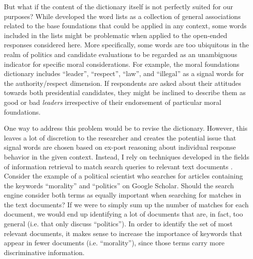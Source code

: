\documentclass[12pt]{article}
\begin{document}
But what if the content of the dictionary itself is not perfectly suited for our purposes? While \citet{graham2009liberals} developed the word lists as a collection of general associations related to the base foundations that could be applied in any context, some words included in the lists might be problematic when applied to the open-ended responses considered here. More specifically, some words are too ubiquitous in the realm of politics and candidate evaluations to be regarded as an unambiguous indicator for specific moral considerations. For example, the moral foundations dictionary includes ``leader'', ``respect'', ``law'', and ``illegal'' as a signal words for the authority/respect dimension. If respondents are asked about their attitudes towards both presidential candidates, they might be inclined to describe them as good or bad \textit{leaders} irrespective of their endorsement of particular moral foundations.

One way to address this problem would be to revise the dictionary. However, this leaves a lot of discretion to the researcher and creates the potential issue that signal words are chosen based on ex-post reasoning about individual response behavior in the given context. Instead, I rely on techniques developed in the fields of information retrieval to match search queries to relevant text documents \citep[see][for an introduction]{manning2008introduction}. Consider the example of a political scientist who searches for articles containing the keywords ``morality'' and ``politics'' on Google Scholar. Should the search engine consider both terms as equally important when searching for matches in the text documents? If we were to simply sum up the number of matches for each document, we would end up identifying a lot of documents that are, in fact, too general (i.e. that only discuss ``politics''). In order to identify the set of most relevant documents, it makes sense to increase the importance of keywords that appear in fewer documents (i.e. ``morality''), since those terms carry more discriminative information.
\end{document}
